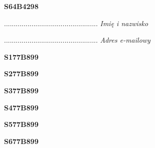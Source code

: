 \begin{turn}{90}\huge \textbf{S64B4298}\end{turn}

\begin{turn}{90}\begin{minipage}{\linewidth} \vspace{20mm} ................................................  \textit{Imię i nazwisko}\end{minipage}\end{turn}

\begin{turn}{90}\begin{minipage}{\linewidth} \vspace{20mm} ................................................  \textit{Adres e-mailowy}\end{minipage}\end{turn}

\begin{turn}{90}\huge \textbf{S177B899}\end{turn}

\begin{turn}{90}\huge \textbf{S277B899}\end{turn}

\begin{turn}{90}\huge \textbf{S377B899}\end{turn}

\begin{turn}{90}\huge \textbf{S477B899}\end{turn}

\begin{turn}{90}\huge \textbf{S577B899}\end{turn}

\begin{turn}{90}\huge \textbf{S677B899}\end{turn}